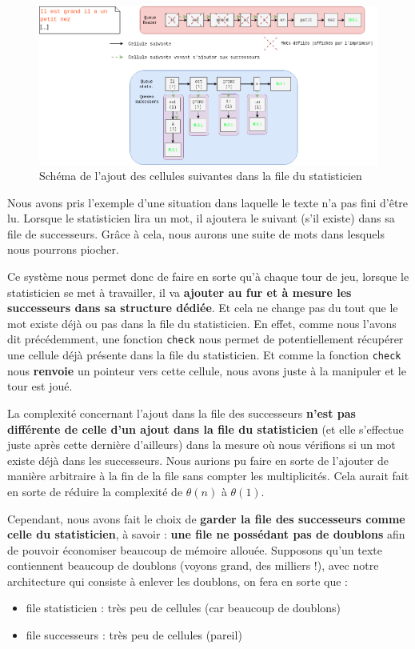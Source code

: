 \documentclass{article}
\newcommand{\inlinecode}[2]{\colorbox{white}{\lstinline[language=#1]$#2$}}
\begin{document}
\begin{figure}[ht!]
\centering
\includegraphics[scale=0.35]{successorsschema.png}
\caption{Schéma de l'ajout des cellules suivantes dans la file du statisticien}
\label{fig:successors_schema}
\end{figure}

Nous avons pris l'exemple d'une situation dans laquelle le texte n'a pas fini d'être lu. Lorsque le statisticien lira un mot, il ajoutera le suivant (s'il existe) dans sa file de successeurs. Grâce à cela, nous aurons une suite de mots dans lesquels nous pourrons piocher.

Ce système nous permet donc de faire en sorte qu'à chaque tour de jeu, lorsque le statisticien se met à travailler, il va \textbf{ajouter au fur et à mesure les successeurs dans sa structure dédiée}. Et cela ne change pas du tout que le mot existe déjà ou pas dans la file du statisticien. En effet, comme nous l'avons dit précédemment, une fonction \inlinecode{C}{check} nous permet de potentiellement récupérer une cellule déjà présente dans la file du statisticien. Et comme la fonction \inlinecode{C}{check} nous \textbf{renvoie} un pointeur vers cette cellule, nous avons juste à la manipuler et le tour est joué.

\label{complexite_successors}

La complexité concernant l'ajout dans la file des successeurs \textbf{n'est pas différente de celle d'un ajout dans la file du statisticien} (et elle s'effectue juste après cette dernière d'ailleurs) dans la mesure où nous vérifions si un mot existe déjà dans les successeurs. Nous aurions pu faire en sorte de l'ajouter de manière arbitraire à la fin de la file sans compter les multiplicités. Cela aurait fait en sorte de réduire la complexité de $\theta(n)$ à $\theta(1)$.

Cependant, nous avons fait le choix de \textbf{garder la file des successeurs comme celle du statisticien}, à savoir : \textbf{une file ne possédant pas de doublons} afin de pouvoir économiser beaucoup de mémoire allouée. Supposons qu'un texte contiennent beaucoup de doublons (voyons grand, des milliers !), avec notre architecture qui consiste à enlever les doublons, on fera en sorte que :
\begin{itemize}
    \item file statisticien : très peu de cellules (car beaucoup de doublons)
    \item file successeurs : très peu de cellules (pareil)
\end{itemize}
\end{document}
